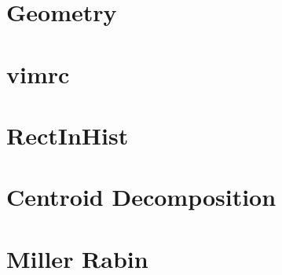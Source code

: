 \documentclass[twocolumn]{article}
\begin{document}
{    \section{Geometry}
    

    \newpage

    \section{vimrc}
    
    \section{RectInHist}
    

    \newpage

    \section{Centroid Decomposition}
    

    \section{Miller Rabin}
    
}
\end{document}
